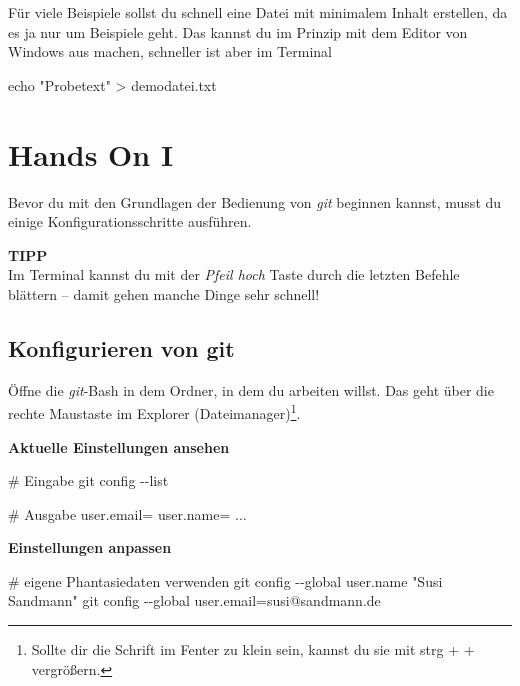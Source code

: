 \documentclass[
  letterpaper,
  DIV=11]{scrreprt}
\newenvironment{Shaded}{\begin{snugshade}}{\end{snugshade}}
\newcommand{\AttributeTok}[1]{\textcolor[rgb]{0.40,0.45,0.13}{#1}}
\newcommand{\BuiltInTok}[1]{\textcolor[rgb]{0.00,0.23,0.31}{#1}}
\newcommand{\CommentTok}[1]{\textcolor[rgb]{0.37,0.37,0.37}{#1}}
\newcommand{\ExtensionTok}[1]{\textcolor[rgb]{0.00,0.23,0.31}{#1}}
\newcommand{\FunctionTok}[1]{\textcolor[rgb]{0.28,0.35,0.67}{#1}}
\newcommand{\NormalTok}[1]{\textcolor[rgb]{0.00,0.23,0.31}{#1}}
\newcommand{\OperatorTok}[1]{\textcolor[rgb]{0.37,0.37,0.37}{#1}}
\newcommand{\StringTok}[1]{\textcolor[rgb]{0.13,0.47,0.30}{#1}}
\newcommand{\git}{\textit{git}\xspace}
\newcommand{\strg}[1]{strg + #1\xspace}
\begin{document}
Für viele Beispiele sollst du schnell eine Datei mit minimalem Inhalt
erstellen, da es ja nur um Beispiele geht. Das kannst du im Prinzip mit
dem Editor von Windows aus machen, schneller ist aber im Terminal

\begin{Shaded}
\begin{Highlighting}[]
\BuiltInTok{echo} \StringTok{"Probetext"} \OperatorTok{\textgreater{}}\NormalTok{ demodatei.txt }
\end{Highlighting}
\end{Shaded}


\chapter{Hands On I}\label{hands-on-i}

Bevor du mit den Grundlagen der Bedienung von \git  beginnen kannst,
musst du einige Konfigurationsschritte ausführen.

\samplestart

\textbf{TIPP}\\
Im Terminal kannst du mit der \emph{Pfeil hoch} Taste durch die letzten
Befehle blättern -- damit gehen manche Dinge sehr schnell! \sampleend

\section{Konfigurieren von git}\label{konfigurieren-von-git}

Öffne die \git-Bash in dem Ordner, in dem du arbeiten willst. Das geht
über die rechte Maustaste im Explorer (Dateimanager)\footnote{Sollte dir
  die Schrift im Fenter zu klein sein, kannst du sie mit \strg{+}
  vergrößern.}.

\textbf{Aktuelle Einstellungen ansehen}

\begin{Shaded}
\begin{Highlighting}[]
\CommentTok{\# Eingabe}
\FunctionTok{git}\NormalTok{ config }\AttributeTok{{-}{-}list}

\CommentTok{\# Ausgabe}
\ExtensionTok{user.email=}
\ExtensionTok{user.name=}
     \ExtensionTok{...}
\end{Highlighting}
\end{Shaded}

\textbf{Einstellungen anpassen}

\begin{Shaded}
\begin{Highlighting}[]
\CommentTok{\# eigene Phantasiedaten verwenden}
\FunctionTok{git}\NormalTok{ config }\AttributeTok{{-}{-}global}\NormalTok{ user.name }\StringTok{"Susi Sandmann"} 
\FunctionTok{git}\NormalTok{ config }\AttributeTok{{-}{-}global}\NormalTok{ user.email=susi@sandmann.de}
\end{Highlighting}
\end{Shaded}
\end{document}
